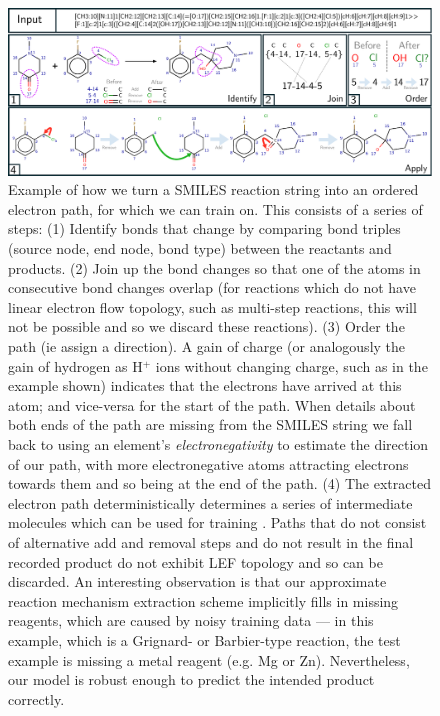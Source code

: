 \begin{figure}[h]
\centering
\includegraphics[width=1.\textwidth]{imgs/dataset_steps}
\caption{
Example of how we turn a SMILES reaction string into an ordered electron path, for which we can train \ourModel on. 
This consists of a series of steps: 
(1) Identify bonds that change by comparing bond triples (source node, end node, bond type) between the reactants and products. 
(2) Join up the bond changes so that one of the atoms in consecutive bond changes overlap (for reactions which do not have linear electron flow topology, such as multi-step reactions, this will not be possible and so we discard these reactions).
(3) Order the path (ie assign a direction). A gain of charge (or analogously the gain of hydrogen as H$^+$ ions without changing charge, such as in the example shown) indicates that the electrons have arrived at this atom; and vice-versa for the start of the path.
When details about both ends of the path are missing from the SMILES string we fall back to using an element's {\em electronegativity} to estimate the direction of our path, with more electronegative atoms attracting electrons towards them and so being at the end of the path. 
(4) The extracted electron path deterministically determines a series of intermediate molecules which can be used for training \ourModel. 
Paths that do not consist of alternative add and removal steps and do not result in the final recorded product do not exhibit LEF topology and so can be discarded. An interesting observation is that our approximate reaction mechanism extraction scheme implicitly fills in missing reagents, which are caused by noisy training data --- in this example, which is a Grignard- or Barbier-type reaction, the test example is missing a metal reagent (e.g. Mg or Zn). Nevertheless, our model is robust enough to predict the intended product correctly.
}
\label{fig:dataset_steps}
\end{figure}

